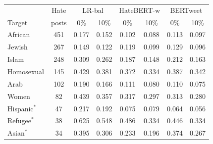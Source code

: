 \begin{tabular}{lccccccc}
\toprule
 & Hate & \multicolumn{2}{c}{LR-bal} & \multicolumn{2}{c}{HateBERT-w} & \multicolumn{2}{c}{BERTweet} \\
Target & posts & 0\% & 10\% & 0\% & 10\% & 0\% & 10\% \\
\midrule
African & 451 & 0.177 & 0.152 & 0.102 & 0.088 & 0.113 & 0.097 \\
Jewish & 267 & 0.149 & 0.122 & 0.119 & 0.099 & 0.129 & 0.096 \\
Islam & 248 & 0.309 & 0.262 & 0.187 & 0.148 & 0.212 & 0.163 \\
Homosexual & 145 & 0.429 & 0.381 & 0.372 & 0.334 & 0.387 & 0.342 \\
Arab & 102 & 0.190 & 0.166 & 0.111 & 0.080 & 0.110 & 0.075 \\
Women & 82 & 0.439 & 0.357 & 0.317 & 0.297 & 0.313 & 0.280 \\
Hispanic$^{*}$ & 47 & 0.217 & 0.192 & 0.075 & 0.079 & 0.064 & 0.056 \\
Refugee$^{*}$ & 38 & 0.625 & 0.548 & 0.486 & 0.334 & 0.446 & 0.334 \\
Asian$^{*}$ & 34 & 0.395 & 0.306 & 0.233 & 0.196 & 0.374 & 0.267 \\
\bottomrule
\end{tabular}
